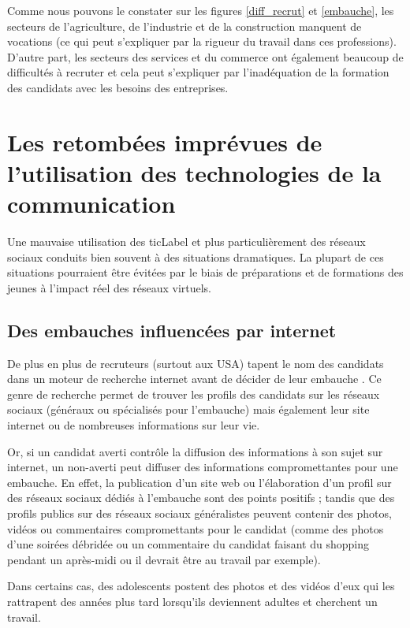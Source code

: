 Comme nous pouvons le constater sur les figures \ref{diff_recrut} et \ref{embauche}, les secteurs de l'agriculture, de l'industrie et de la construction manquent de vocations (ce qui peut s'expliquer par la rigueur du travail dans ces professions). D'autre part, les secteurs des services et du commerce ont également beaucoup de difficultés à recruter et cela peut s'expliquer par l'inadéquation de la formation des candidats avec les besoins des entreprises.


\section{Les retombées imprévues de l'utilisation des technologies de la communication}
Une mauvaise utilisation des \gls{ticLabel} et plus particulièrement des réseaux sociaux conduits bien souvent à des situations dramatiques. La plupart de ces situations pourraient être évitées par le biais de préparations et de formations des jeunes à l'impact réel des réseaux virtuels.

\subsection{Des embauches influencées par internet}
De plus en plus de recruteurs (surtout aux USA) tapent le nom des candidats dans un moteur de recherche internet avant de décider de leur embauche \cite{recrutement_internet, recrut_social_network}. Ce genre de recherche permet de trouver les profils des candidats sur les réseaux sociaux (généraux ou spécialisés pour l'embauche) mais également leur site internet ou de nombreuses informations sur leur vie.

Or, si un candidat averti contrôle la diffusion des informations à son sujet sur internet, un non-averti peut diffuser des informations compromettantes pour une embauche. En effet, la publication d'un site web ou l'élaboration d'un profil sur des réseaux sociaux dédiés à l'embauche sont des points positifs ; tandis que des profils publics sur des réseaux sociaux généralistes peuvent contenir des photos, vidéos ou commentaires compromettants pour le candidat (comme des photos d'une soirées débridée ou un commentaire du candidat faisant du shopping pendant un après-midi ou il devrait être au travail par exemple).

Dans certains cas, des adolescents postent des photos et des vidéos d'eux qui les rattrapent des années plus tard lorsqu'ils deviennent adultes et cherchent un travail.

